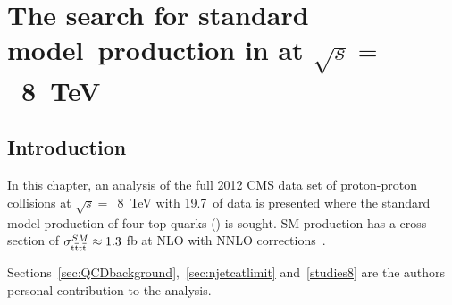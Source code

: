 \chapter{The search for standard model~\tttt production in \runone at $\sqrt{s} =$~8~TeV }
\label{c:Run1}

\section{Introduction}
In this chapter, an analysis of the full 2012 CMS data set of proton-proton collisions at $\sqrt{s} =$~8~TeV with 19.7~\fbinv of data is presented where the standard model production of four top quarks (\tttt) is sought. SM \tttt production has a cross section of $\sigma_{{\mathrm{t}\overline{\mathrm{t}}\mathrm{t}\overline{\mathrm{t}}}}^{SM}  \approx 1.3$ fb at NLO with NNLO corrections~\cite{Barger201070,Bevilacqua2012}. 



Sections~\ref{sec:QCDbackground},~\ref{sec:njetcatlimit} and~\ref{studies8} are the authors personal contribution to the analysis.

